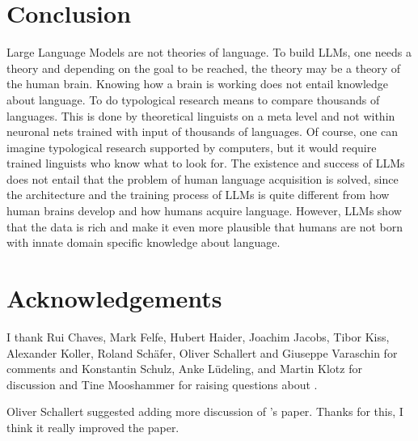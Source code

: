 \section{Conclusion}

Large Language Models are not theories of language. To build LLMs, one needs a theory and depending
on the goal to be reached, the theory may be a theory of the human brain. Knowing how a brain is
working does not entail knowledge about language. To do typological research means to compare
thousands of languages. This is done by theoretical linguists on a meta level and not within
neuronal nets trained with input of thousands of languages. Of course, one can imagine typological
research supported by computers, but it would require trained linguists who know what to look for.
The existence and success of LLMs does not entail
that the problem of human language acquisition is solved, since the architecture and the training
process of LLMs is quite different from how human brains develop and how humans acquire
language. However, LLMs show that the data is rich and make it even more plausible that humans are
not born with innate domain specific knowledge about language.

\section*{Acknowledgements}

I thank Rui Chaves, Mark Felfe, Hubert Haider, Joachim Jacobs, Tibor Kiss, Alexander Koller, Roland
Schäfer, Oliver Schallert and Giuseppe
Varaschin for comments and Konstantin Schulz, Anke Lüdeling, and Martin Klotz for 
discussion and Tine Mooshammer for raising questions about .

Oliver Schallert suggested adding more discussion of \citeauthor{Piantadosi2024a}'s paper. Thanks
for this, I think it really improved the paper.

